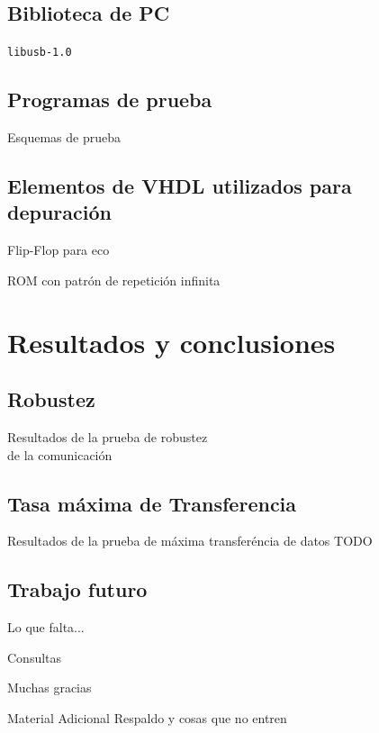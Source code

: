 \documentclass[11pt,a4paper]{beamer}
\begin{document}
		\subsection{Biblioteca de PC}
			\begin{frame}{\texttt{libusb-1.0}}
				
			\end{frame}
		\subsection{Programas de prueba}
			\begin{frame}{Esquemas de prueba}
				
			\end{frame}
		\subsection{Elementos de VHDL utilizados para depuración}
			\begin{frame}{Flip-Flop para eco}
				
			\end{frame}
			\begin{frame}{ROM con patrón de repetición infinita}
				
			\end{frame}
	\section{Resultados y conclusiones}
		\subsection{Robustez}
			\begin{frame}{Resultados de la prueba de robustez\\de la comunicación}
				
			\end{frame}
		\subsection{Tasa máxima de Transferencia}
			\begin{frame}{Resultados de la prueba de máxima transferéncia de datos}
				TODO
			\end{frame}
		\subsection{Trabajo futuro}
			\begin{frame}{Lo que falta...}
				
			\end{frame}
			\begin{frame}{Consultas}
				
			\end{frame}
			\begin{frame}[c]
				\centering
				\alert {Muchas gracias}
			\end{frame}
			
			\begin{frame}{Material Adicional}
				\centering
				Respaldo y cosas que no entren
			\end{frame}
\end{document}
